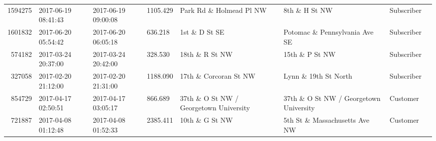 \documentclass[11pt]{article}
\begin{document}
\begin{description}
\begin{tabular}{r|lllllll}
	 1594275                                                 & 2017-06-19 08:41:43                                     & 2017-06-19 09:00:08                                     & 1105.429                                                & Park Rd \& Holmead Pl NW                               & 8th \& H St NW                                         & Subscriber                                             \\
	 1601832                                                 & 2017-06-20 05:54:42                                     & 2017-06-20 06:05:18                                     &  636.218                                                & 1st \& D St SE                                         & Potomac \& Pennsylvania Ave SE                         & Subscriber                                             \\
	  574182                                                 & 2017-03-24 20:37:00                                     & 2017-03-24 20:42:00                                     &  328.530                                                & 18th \& R St NW                                        & 15th \& P St NW                                        & Subscriber                                             \\
	  327058                                                 & 2017-02-20 21:12:00                                     & 2017-02-20 21:31:00                                     & 1188.090                                                & 17th \& Corcoran St NW                                 & Lynn \& 19th St North                                  & Subscriber                                             \\
	  854729                                                 & 2017-04-17 02:50:51                                     & 2017-04-17 03:05:17                                     &  866.689                                                & 37th \& O St NW / Georgetown University                & 37th \& O St NW / Georgetown University                & Customer                                               \\
	  721887                                                 & 2017-04-08 01:12:48                                     & 2017-04-08 01:52:33                                     & 2385.411                                                & 10th \& G St NW                                        & 5th St \& Massachusetts Ave NW                         & Customer                                               \\

\end{tabular}
\end{description}
\end{document}
